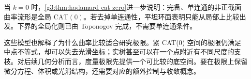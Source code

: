当 \(k=0\) 时，\cref{g3:thm:hadamard-cat-zero}进一步说明：完备、单连通的非正截面曲率流形是全局 \(\mathrm{CAT}(0)\)。若去掉单连通性，平坦环面表明只能从局部上比较出发。下界的全局化则已由 Toponogov 完成，不需要单连通条件。

\ProseParagraphBreak

这些模型也解释了为什么曲率比较适合研究极限。紧 CAT(0) 空间的极限仍满足中点不等式，却可以失去光滑坐标；实树甚至可以在一个点附近有不同尺度的支枝。对后续几何分析而言，度量极限先提供一个可比较的底空间。要在极限上保留微分方程、体积或光滑结构，还需要对应的额外控制与收敛概念。
